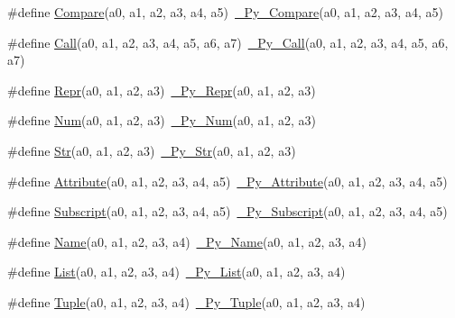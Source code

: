\begin{DoxyCompactItemize}
\item 
\#define \mbox{\hyperlink{_python-ast_8h_ae328ce3376c52a3dba42ab3708d5571b}{Compare}}(a0,  a1,  a2,  a3,  a4,  a5)~\mbox{\hyperlink{_python-ast_8h_a2b463e29d526a83d1854ded8b88e9d7b}{\+\_\+\+Py\+\_\+\+Compare}}(a0, a1, a2, a3, a4, a5)
\item 
\#define \mbox{\hyperlink{_python-ast_8h_a67521ede95e4d7bdfd5aced80c17a3aa}{Call}}(a0,  a1,  a2,  a3,  a4,  a5,  a6,  a7)~\mbox{\hyperlink{_python-ast_8h_a8df37634337d0ad319ac213dc055560d}{\+\_\+\+Py\+\_\+\+Call}}(a0, a1, a2, a3, a4, a5, a6, a7)
\item 
\#define \mbox{\hyperlink{_python-ast_8h_a88bd2651256da6ccebace0dfb90d8b72}{Repr}}(a0,  a1,  a2,  a3)~\mbox{\hyperlink{_python-ast_8h_aa19b82f9b129467bc767ddf64d7ede62}{\+\_\+\+Py\+\_\+\+Repr}}(a0, a1, a2, a3)
\item 
\#define \mbox{\hyperlink{_python-ast_8h_a8c8f50b76976c33a0eaa959e28d7b453}{Num}}(a0,  a1,  a2,  a3)~\mbox{\hyperlink{_python-ast_8h_a79a9fac1cfaeeff22b78665840bca615}{\+\_\+\+Py\+\_\+\+Num}}(a0, a1, a2, a3)
\item 
\#define \mbox{\hyperlink{_python-ast_8h_a2b805f698f55c2006bea5dfbc0c582bd}{Str}}(a0,  a1,  a2,  a3)~\mbox{\hyperlink{_python-ast_8h_a2e03cfff5f4c8b214e1ca1d61fc3b5cb}{\+\_\+\+Py\+\_\+\+Str}}(a0, a1, a2, a3)
\item 
\#define \mbox{\hyperlink{_python-ast_8h_ac5330959be327b277dd98b3b793b8b12}{Attribute}}(a0,  a1,  a2,  a3,  a4,  a5)~\mbox{\hyperlink{_python-ast_8h_aee0b04133ba38fe51fc7d4195644c5d7}{\+\_\+\+Py\+\_\+\+Attribute}}(a0, a1, a2, a3, a4, a5)
\item 
\#define \mbox{\hyperlink{_python-ast_8h_a49a0a37e937fc34b38da7b8eef6c6ea9}{Subscript}}(a0,  a1,  a2,  a3,  a4,  a5)~\mbox{\hyperlink{_python-ast_8h_a4f0bd3273fab37948889711e668fcc5c}{\+\_\+\+Py\+\_\+\+Subscript}}(a0, a1, a2, a3, a4, a5)
\item 
\#define \mbox{\hyperlink{_python-ast_8h_a3e9f22c154a65956ebd413d2d8dafc0f}{Name}}(a0,  a1,  a2,  a3,  a4)~\mbox{\hyperlink{_python-ast_8h_add305b1df2f60623616644e2bc5c4c96}{\+\_\+\+Py\+\_\+\+Name}}(a0, a1, a2, a3, a4)
\item 
\#define \mbox{\hyperlink{_python-ast_8h_a201830357d214aabbdb46b4163c792cf}{List}}(a0,  a1,  a2,  a3,  a4)~\mbox{\hyperlink{_python-ast_8h_a60f89e3a3bd0f6d993ddcc2c3a3eb9f0}{\+\_\+\+Py\+\_\+\+List}}(a0, a1, a2, a3, a4)
\item 
\#define \mbox{\hyperlink{_python-ast_8h_a3f332c0be139cb870e516bad9b6a9366}{Tuple}}(a0,  a1,  a2,  a3,  a4)~\mbox{\hyperlink{_python-ast_8h_adcbcc2836882c9eda8680dffb9cde4d5}{\+\_\+\+Py\+\_\+\+Tuple}}(a0, a1, a2, a3, a4)

\end{DoxyCompactItemize}
